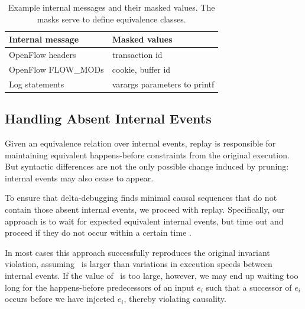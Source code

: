 \begin{table}
\centering
\begin{tabular}{|l|l|}
\hline
Internal message & Masked values \\
\hline
OpenFlow headers & transaction id\\
OpenFlow FLOW\_MODs & cookie, buffer id \\
Log statements & varargs parameters to printf \\
\hline
\end{tabular}
\caption{Example internal messages and their masked values. The masks serve to
define equivalence classes.}
\label{tab:fingerprints}
\end{table}

\subsection{Handling Absent Internal Events}
\label{subsec:divergence}

Given an equivalence relation over internal events, replay
is responsible for maintaining equivalent happens-before constraints from the
original execution.
But syntactic differences are not the
only possible change induced by pruning: internal events
may also cease to appear.


To ensure that delta-debugging finds minimal causal sequences that do not contain those
absent internal events, we proceed with replay.
Specifically, our approach is to wait for expected equivalent internal events, but time out and proceed
if they do not occur within a certain time \textepsilon.

In most cases this approach successfully reproduces the original invariant
violation, assuming \textepsilon~is larger than variations in execution speeds
between internal events. If the value of \textepsilon~is too large, however, we may end up
waiting too long for the happens-before predecessors of an input $e_i$ such that a
successor of $e_i$ occurs before we have injected $e_i$,
thereby violating causality.

